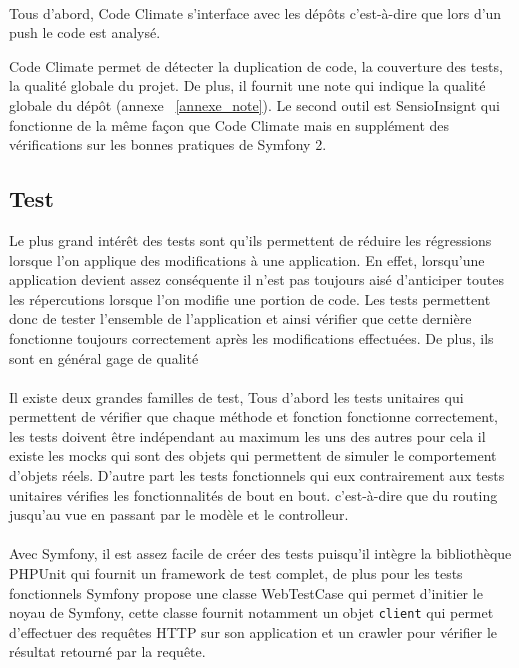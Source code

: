 \paragraph{}
Tous d'abord, Code Climate s'interface avec les dépôts c'est-à-dire que lors d'un push le code est analysé.

Code Climate permet de détecter la duplication de code, la couverture des tests, la qualité globale du projet. De plus, il fournit une note qui indique la qualité globale du dépôt (annexe ~\ref{annexe_note}). 
Le second outil est SensioInsignt qui fonctionne de la même façon que Code Climate mais en supplément des vérifications sur les bonnes pratiques de Symfony 2.
\subsection{Test}
Le plus grand intérêt des tests sont qu'ils permettent de réduire les régressions lorsque l'on applique des modifications à une application. En effet, lorsqu'une application devient assez conséquente il n'est pas toujours aisé d'anticiper toutes les répercutions lorsque l'on modifie une portion de code. Les tests permettent donc de tester l'ensemble de l'application et ainsi vérifier que cette dernière fonctionne toujours correctement après les modifications effectuées. 
De plus, ils sont en général gage de qualité
 \paragraph{}
 Il existe deux grandes familles de test, Tous d'abord les tests unitaires qui permettent de vérifier que chaque méthode et fonction fonctionne correctement, les tests doivent être indépendant au maximum les uns des autres pour cela il existe les mocks qui sont des objets qui permettent de simuler le comportement d'objets \og{}réels\fg{}.
 D'autre part les tests fonctionnels qui eux contrairement aux tests unitaires vérifies les fonctionnalités de bout en bout. c'est-à-dire que du routing jusqu'au vue en passant par le modèle et le controlleur.
  \paragraph{}
 Avec Symfony, il est assez facile de créer des tests puisqu'il intègre la bibliothèque PHPUnit qui fournit un framework de test complet, de plus pour les tests fonctionnels Symfony propose une classe WebTestCase qui permet d'initier le noyau de Symfony, cette classe fournit notamment un objet \verb?client? qui permet d'effectuer des requêtes HTTP sur son application et un crawler pour vérifier le résultat retourné par la requête.
